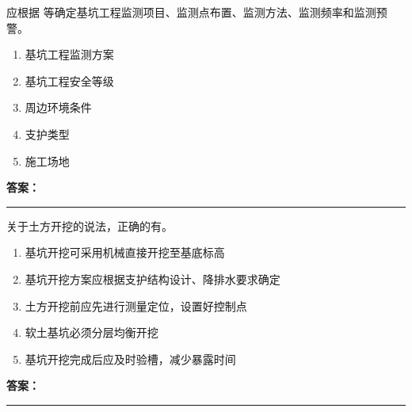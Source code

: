 \documentclass[UTF8,fontset=fandol,11pt]{ctexart}
\newcommand{\answerline}{\textcolor{answerred}{\rule{2.4cm}{0.7pt}}}
\begin{document}
\begin{quizbox}[title={乱序第 197 题｜第三章基坑工程}]

应根据 等确定基坑工程监测项目、监测点布置、监测方法、监测频率和监测预警。\\

\begin{enumerate}[label=\Alph*.]

\item 基坑工程监测方案

\item 基坑工程安全等级

\item 周边环境条件

\item 支护类型

\item 施工场地

\end{enumerate}

\textbf{\textcolor{answerred}{答案：}} \answerline

\end{quizbox}

\vspace{0.2em}

\begin{quizbox}[title={乱序第 198 题｜第一章土方工程}]

关于土方开挖的说法，正确的有。\\

\begin{enumerate}[label=\Alph*.]

\item 基坑开挖可采用机械直接开挖至基底标高

\item 基坑开挖方案应根据支护结构设计、降排水要求确定

\item 土方开挖前应先进行测量定位，设置好控制点

\item 软土基坑必须分层均衡开挖

\item 基坑开挖完成后应及时验槽，减少暴露时间

\end{enumerate}

\textbf{\textcolor{answerred}{答案：}} \answerline

\end{quizbox}

\vspace{0.2em}
\end{document}

